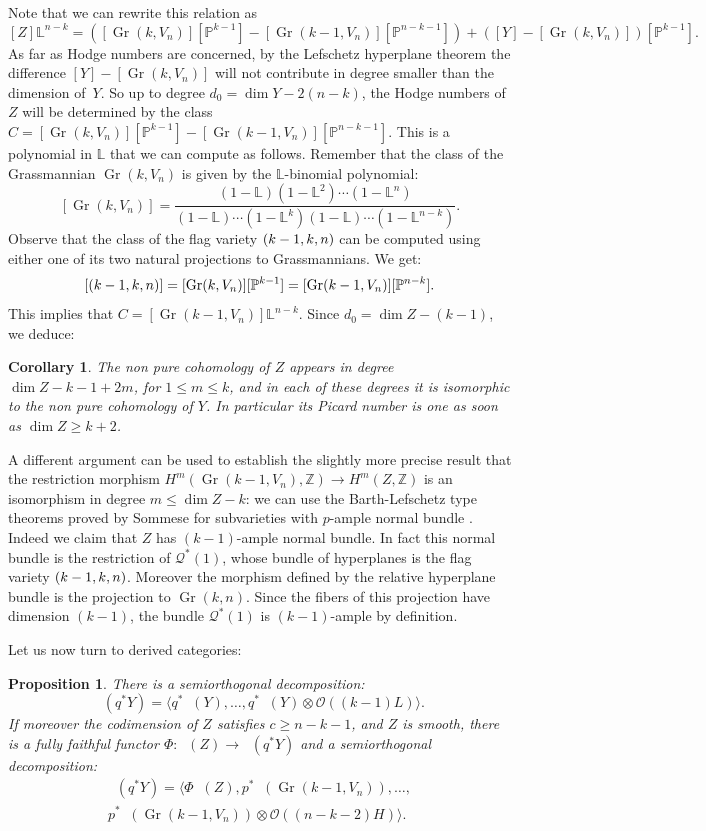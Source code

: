 \documentclass[JEP,XML,SOM,Unicode,NoEqCountersInSection]{cedram}
\newcommand{\NoChangel}[1]{%
\expandafter\let\csname old\string#1\endcsname=#1
\let#1=\relax
\newcommand{#1}{\mathcode`l="716C\csname old\string#1\endcsname\mathcode`l="7160 }%
}
\let\mathcal\mathscr
\theoremstyle{plain}
\newtheorem{prop}[theorem]{Proposition}
\newtheorem{cor}[theorem]{Corollary}
\theoremstyle{definition}
\newcommand{\cat}[1]{\mathsf{#1}}
\newcommand{\sod}[1]{\langle #1 \rangle}
\newcommand{\bsod}[1]{\bigl\langle #1\bigr\rangle}
\DeclareMathOperator{\Db}{{\cat{D}^{\mathrm{b}}}}
\DeclareMathOperator{\Gr}{Gr}
\DeclareMathOperator{\Fl}{Fl}\NoChangel{\Fl}
\newcommand{\ZZ}{\mathbb{Z}}
\newcommand{\LL}{\mathbb{L}}
\newcommand{\PP}{\mathbb{P}}
\newcommand{\sheaf}[1]{\mathcal{#1}}
\newcommand{\ko}{\sheaf{O}}\let\OO\ko\let\cO\ko
\begin{document}
Note that we can rewrite this relation as
\[
[Z]\LL^{n-k}=
([\Gr(k,V_n)][\PP^{k-1}]-[\Gr(k-1,V_n)][\PP^{n-k-1}])+([Y]-[\Gr(k,V_n)])[\PP^{k-1}].
\]
As far as Hodge numbers are concerned, by the Lefschetz hyperplane theorem the difference
$[Y]-[\Gr(k,V_n)]$ will
not contribute in degree smaller than the dimension of~$Y$. So up to degree $d_0=\dim Y-2(n-k)$,
the Hodge numbers of $Z$ will be determined by the class $C=[\Gr(k,V_n)][\PP^{k-1}]-[\Gr(k-1,V_n)][\PP^{n-k-1}]$.
This is a polynomial in $\LL$ that we can compute as follows. Remember that the class of the Grassmannian $\Gr(k,V_n)$
is given by the $\LL$-binomial polynomial:
\[
[\Gr(k,V_n)]=\frac{(1-\LL)(1-\LL^2)\cdots (1-\LL^n)}{(1-\LL)\cdots (1-\LL^k)(1-\LL)\cdots (1-\LL^{n-k})}.
\]
Observe that the class of the flag variety $\Fl(k-1,k,n)$ can be computed using either one of its two natural
projections to Grassmannians. We get:
\[
[\Fl(k-1,k,n)]=[\Gr(k,V_n)][\PP^{k-1}]=[\Gr(k-1,V_n)][\PP^{n-k}].
\]
This implies that $C=[\Gr(k-1,V_n)]\LL^{n-k}$. Since $d_0=\dim Z-(k-1)$, we deduce:

\begin{cor}\label{hodgeZ}
The non pure cohomology of $Z$ appears in degree \hbox{$\dim Z\!-\!k\!-\!1\!+\!2m$}, for $1\le m\le k$,
and in each of these degrees it is isomorphic to the non pure cohomology of $Y$.
In particular its Picard number is one as soon as $\dim Z\ge k+2$.
\end{cor}

A different argument can be used to establish the slightly more precise result that the restriction morphism $H^m(\Gr(k-1,V_n),\ZZ)\to H^m(Z,\ZZ)$ is an isomorphism
in degree $m\le \dim Z -k$: we can use the Barth-Lefschetz type theorems proved
by Sommese for subvarieties with $p$-ample normal bundle \cite[Prop.\,2.6]{sommese}. Indeed we
claim that $Z$ has $(k-1)$-ample normal bundle. In fact this normal bundle is the restriction of
$\mathcal{Q}^*(1)$, whose bundle of hyperplanes is the flag variety $\Fl(k-1,k,n)$. Moreover the morphism
defined by the relative hyperplane bundle is the projection to $\Gr(k,n)$. Since the fibers of
this projection have dimension $(k-1)$, the bundle $\mathcal{Q}^*(1)$ is $(k-1)$-ample by definition.

Let us now turn to derived categories:

\begin{prop}\label{prop:semiorth-for-Hsections-in-jumps}
There is a semiorthogonal decomposition:
\begin{equation}\label{eq:orlov-deco-jump}
\Db(q^* Y) = \sod{q^*\Db(Y),\ldots,q^*\Db(Y)\otimes \ko((k-1)L)}.
\end{equation}
If moreover the codimension of $Z$ satisfies $c \geq n-k-1$, and $Z$ is smooth, there is a fully faithful functor
$\Phi: \Db(Z) \to \Db(q^* Y)$ and a semiorthogonal decomposition:%
\begin{multline}\label{eq:our-deco-jump}
\Db(q^* Y)
= \bsod{\Phi\Db(Z), p^*\Db(\Gr(k-1,V_n)),\ldots,\\
p^*\Db(\Gr(k-1,V_n))\otimes \ko((n-k-2)H)}.
\end{multline}
\end{prop}
\end{document}
